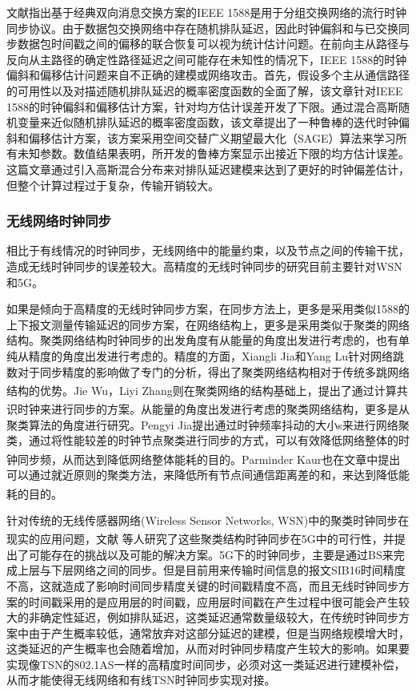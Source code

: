 \documentclass[UTF8,a4paper,12pt]{ctexart}
\numberwithin{equation}{section}
\begin{document}
文献\cite{karthik2020robust}指出基于经典双向消息交换方案的IEEE 1588是用于分组交换网络的流行时钟同步协议。由于数据包交换网络中存在随机排队延迟，因此时钟偏斜和与已交换同步数据包时间戳之间的偏移的联合恢复可以视为统计估计问题。在前向主从路径与反向从主路径的确定性路径延迟之间可能存在未知性的情况下，IEEE 1588的时钟偏斜和偏移估计问题来自不正确的建模或网络攻击。首先，假设多个主从通信路径的可用性以及对描述随机排队延迟的概率密度函数的全面了解，该文章针对IEEE 1588的时钟偏斜和偏移估计方案，针对均方估计误差开发了下限。通过混合高斯随机变量来近似随机排队延迟的概率密度函数，该文章提出了一种鲁棒的迭代时钟偏斜和偏移估计方案，该方案采用空间交替广义期望最大化（SAGE）算法来学习所有未知参数。数值结果表明，所开发的鲁棒方案显示出接近下限的均方估计误差。这篇文章通过引入高斯混合分布来对排队延迟建模来达到了更好的时钟偏差估计，但整个计算过程过于复杂，传输开销较大。

\subsubsection{无线网络时钟同步}

相比于有线情况的时钟同步，无线网络中的能量约束，以及节点之间的传输干扰，造成无线时钟同步的误差较大。高精度的无线时钟同步的研究目前主要针对WSN和5G。

如果是倾向于高精度的无线时钟同步方案，在同步方法上，更多是采用类似1588的上下报文测量传输延迟的同步方案，在网络结构上，更多是采用类似于聚类的网络结构。聚类网络结构时钟同步的出发角度有从能量的角度出发进行考虑的，也有单纯从精度的角度出发进行考虑的。精度的方面，Xiangli Jia和Yang Lu针对网络跳数对于同步精度的影响做了专门的分析，得出了聚类网络结构相对于传统多跳网络结构的优势\textsuperscript{\cite{jia2019improved}}。Jie Wu，Liyi Zhang则在聚类网络的结构基础上，提出了通过计算共识时钟来进行同步的方案\textsuperscript{\cite{wu2014cluster}}。从能量的角度出发进行考虑的聚类网络结构，更多是从聚类算法的角度进行研究。Pengyi Jia提出通过时钟频率抖动的大小s来进行网络聚类，通过将性能较差的时钟节点聚类进行同步的方式，可以有效降低网络整体的时钟同步频，从而达到降低网络整体能耗的目的\textsuperscript{\cite{jia2019distributed}}。Parminder Kaur也在文章中提出可以通过就近原则的聚类方法，来降低所有节点间通信距离差的和，来达到降低能耗的目的\textsuperscript{\cite{kaur2015energy}}。


针对传统的无线传感器网络(Wireless Sensor Networks, WSN)中的聚类时钟同步在现实的应用问题，文献\textsuperscript{\cite{lee2011accuracy}}  等人研究了这些聚类结构时钟同步在5G中的可行性，并提出了可能存在的挑战以及可能的解决方案。5G下的时钟同步，主要是通过BS来完成上层与下层网络之间的同步。但是目前用来传输时间信息的报文SIB16时间精度不高，这就造成了影响时间同步精度关键的时间戳精度不高，而且无线时钟同步方案的时间戳采用的是应用层的时间戳，应用层时间戳在产生过程中很可能会产生较大的非确定性延迟，例如排队延迟，这类延迟通常数量级较大，在传统时钟同步方案中由于产生概率较低，通常放弃对这部分延迟的建模，但是当网络规模增大时，这类延迟的产生概率也会随着增加，从而对时钟同步精度产生较大的影响。如果要实现像TSN的802.1AS一样的高精度时间同步，必须对这一类延迟进行建模补偿，从而才能使得无线网络和有线TSN时钟同步实现对接。
\end{document}
